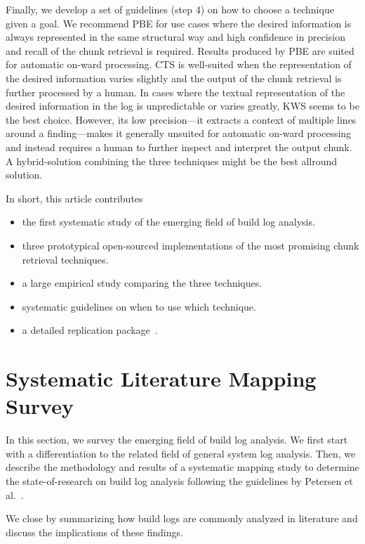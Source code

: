Finally, we develop a set of guidelines (step 4) on how to choose a
technique given a goal.
We recommend PBE for use cases where the desired information is always
represented in the same structural way and high confidence in
precision and recall of the chunk retrieval is required.
Results
produced by PBE are suited for automatic on-ward processing.
CTS is
well-suited when the representation of the desired information varies
slightly and the output of the chunk retrieval is further processed by
a human.
In cases where the textual representation of the desired
information in the log is unpredictable or varies greatly, KWS seems
to be the best choice.
However, its low precision---it extracts a
context of multiple lines around a finding---makes it generally
unsuited for automatic on-ward processing and instead requires a human
to further inspect and interpret the output chunk.
A hybrid-solution combining the three techniques might be the best
allround solution.

In short, this article contributes
\begin{itemize}
\item the first systematic study of the emerging field of build log
analysis.
\item three prototypical open-sourced implementations of the most
promising chunk retrieval techniques.
\item a large empirical study comparing the three techniques.
\item systematic guidelines on when to use which technique.
\item a detailed replication package~\cite{brandt2020chunk-replication}.
\end{itemize}

\section{Systematic Literature Mapping Survey}
\label{sec:survey}

In this section, we survey the emerging field of build log
analysis.
We first start with a differentiation to the related field of general
system log analysis.
Then, we describe the methodology and results of a systematic mapping
study to
determine the state-of-research on build log analysis following the
guidelines by Petersen et
al.~\cite{petersen2008systematic,petersen2015guidelines}.

We close by summarizing how build logs are commonly
analyzed in literature and discuss the implications of these findings.

